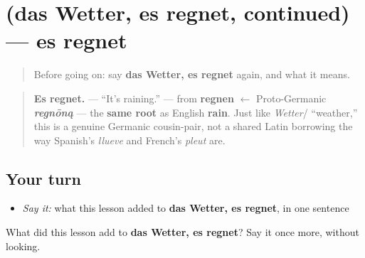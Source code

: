 \section[(das Wetter, es regnet, continued)]{(das Wetter, es regnet, continued) — es regnet}

\label{lesson:GE-C21-das-wetter-more}



\begin{quote}
Before going on: say \textbf{das Wetter, es regnet} again, and what it means.
\end{quote}

\begin{cousinweb}
\begin{quote}
\textbf{Es regnet.} — \textquotedblleft{}It's raining.\textquotedblright{} — from \textbf{regnen} $\leftarrow$ Proto-Germanic \emph{\textbf{regnōną}} — the \textbf{same root} as English \textbf{rain}. Just like \emph{Wetter}/ \textquotedblleft{}weather,\textquotedblright{} this is a genuine Germanic cousin-pair, not a shared Latin borrowing the way Spanish's \emph{llueve} and French's \emph{pleut} are.
\end{quote}
\end{cousinweb}

\subsection*{Your turn}
\begin{itemize}
\raggedright
  \item \emph{Say it:} what this lesson added to \textbf{das Wetter, es regnet}, in one sentence
\end{itemize}

\begin{tcolorbox}[breakable,colback=teal!4,colframe=teal!35!black,title={Before you move on}]
What did this lesson add to \textbf{das Wetter, es regnet}? Say it once more, without looking.
\end{tcolorbox}
